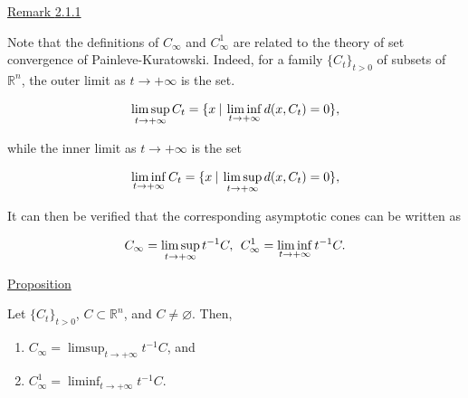 \documentclass[a4paper,11pt]{jsarticle}
\newcommand{\PROPOSITION}[2]{\begin{itembox}[l]{\underline{Proposition {#1} }}{#2}\end{itembox}}
\newcommand{\REMARK}[2]{\begin{itembox}[l]{\underline{Remark {#1} }}{#2}\end{itembox}}
\newcommand{\NDemenstionalRealEuclideanSpace}{\mathbb{R}^n}
\begin{document}
\REMARK{2.1.1}{
  Note that the definitions of $C_{\infty}$ and $C_{\infty}^1$ are related to the theory of set convergence of Painleve-Kuratowski. Indeed, for a family $\{C_t\}_{t>0}$ of subsets of $\NDemenstionalRealEuclideanSpace$, the outer limit as $t \rightarrow + \infty$ is the set.

  \begin{equation}
    \limsup_{t \to +\infty} C_t = \{x \:|\: \liminf_{t \to +\infty} d(x, C_t) = 0\}, \notag
  \end{equation}

  while the inner limit as $t \rightarrow +\infty$ is the set

  \begin{equation}
    \liminf_{t \to +\infty} C_t = \{x \:|\: \limsup_{t \to +\infty} d(x, C_t) = 0\}, \notag
  \end{equation}

  It can then be verified that the corresponding asymptotic cones can be written as

  \begin{equation}
    C_{\infty} = \limsup_{t \to +\infty} t^{-1} C,\:\: C_{\infty}^1  = \liminf_{t \to +\infty} t^{-1} C. \notag
  \end{equation}
}

\PROPOSITION{}{
  Let $\{C_t\}_{t > 0}$, $C \subset \NDemenstionalRealEuclideanSpace$, and $C \ne \varnothing $. Then,

  \begin{enumerate}
    \item $C_{\infty} = \limsup_{t \to + \infty} t^{-1}C$, and
    \item $C_{\infty}^{1} = \liminf_{t \to + \infty} t^{-1}C$.
  \end{enumerate}
}
\end{document}
